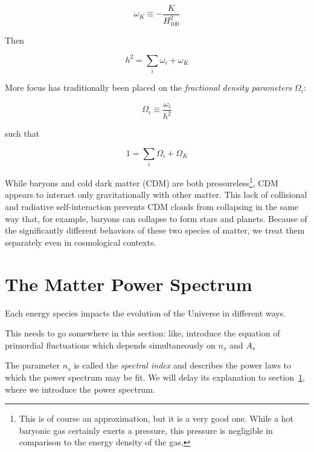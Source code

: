 \begin{equation}
\omega_{K} \equiv -\frac{K}{H_{100}^2}
\end{equation}

Then

\begin{equation}
h^2 = \sum_i \omega_i + \omega_K
\end{equation}

More focus has traditionally been placed on
the \textit{fractional density parameters} $\Omega_i$:

\begin{equation}
\Omega_i \equiv \frac{\omega_i}{h^2}
\end{equation} %

such that 

\begin{equation}
1 = \sum_i \Omega_i + \Omega_K
\end{equation}


While baryons and cold dark matter (CDM) are both pressureless\footnote{This 
is of
course an approximation, but it is a very good one. While a hot baryonic gas 
certainly exerts a pressure, this pressure is negligible in comparison to the 
energy density of the gas.}, CDM appears to interact only gravitationally
with other matter. This lack of collisional and radiative self-interaction
prevents CDM clouds from collapsing in the same way that, for example,
baryons can collapse to form stars and planets. Because of the significantly
different behaviors of these two species of matter, we treat them separately
even in cosmological contexts.

\section{The Matter Power Spectrum}
\label{sec: Pk_intro}

Each energy species impacts the evolution of the Universe in different ways.

This needs to go somewhere in this section: like, introduce the equation of
primordial fluctuations which depends simultaneously on $n_s$ and $A_s$


The parameter $n_s$ is called the \textit{spectral index} and describes the 
power laws
to which the power spectrum may be fit. We will delay its explanation to
section~\ref{sec: Pk_intro}, where we introduce the power spectrum.

